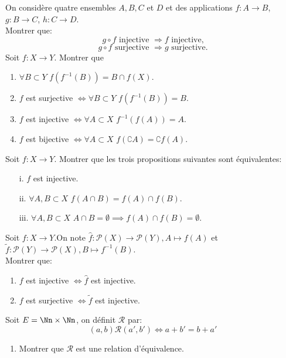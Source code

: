 \documentclass[10pt, a4paper, twocolumn]{homework}
\begin{document}
\exercice
On consid\`ere quatre ensembles $A,B,C$ et $D$ et des applications $f:A\rightarrow B$, $g:B\rightarrow
C$, $h:C\rightarrow D$.\\
Montrer que:
$$g\circ f\text{ injective } \Rightarrow f\text{ injective,}$$
$$g\circ f\text{ surjective } \Rightarrow g\text{ surjective.}$$
\exercice
Soit $f : X \rightarrow Y$. Montrer que
\begin{enumerate}
\item $\forall B \subset Y \, \, f (f^{-1} (B)) = B \cap f (X)$.
\item $f$ est surjective $\iff \forall B \subset Y \, \, f (f^{-1} (B)) = B $.
\item $f$ est injective $\iff \forall A \subset X \, \, f^{-1} (f(A)) = A $.
\item $f$ est bijective $\iff \forall A \subset X \, \,f (\complement A) = \complement f (A).$
\end{enumerate}
\exercice
Soit $f : X \rightarrow Y$. Montrer que les trois propositions suivantes sont
\'equivalentes:
\begin{enumerate}
\item[i. ] $f$ est injective.
\item[ii. ] $\forall A, B \subset X \, \, f (A \cap B) = f (A) \cap f (B)$.
\item[iii. ]$\forall A, B \subset X \, \, A \cap B = \emptyset \implies
f (A) \cap f (B) = \emptyset$.
\end{enumerate}
\exercice
Soit $f : X \rightarrow Y$.On note ${\hat{f}} : {\mathcal{P} (X)} \to {\mathcal{P} (Y)},
{A} \mapsto {f (A)}$ et ${\tilde{f}} : {\mathcal{P} (Y)} \to {\mathcal{P} (X)},
{B} \mapsto {f^{-1} (B)}$.\\
Montrer que:
\begin{enumerate}
\item $f$ est injective $\iff \hat{f}$ est injective.
\item $f$ est surjective $\iff \tilde{f}$ est injective.
\end{enumerate}
\exercice
Soit $E=\Nn\times\Nn$, on d\'efinit $\mathcal{R}$ par:\\

$$(a,b)\mathcal{R}(a',b')\Leftrightarrow a+b'=b+a'$$
\begin{enumerate}
  \item Montrer que $\mathcal{R}$ est une relation d'équivalence.
\end{enumerate}
\end{document}
